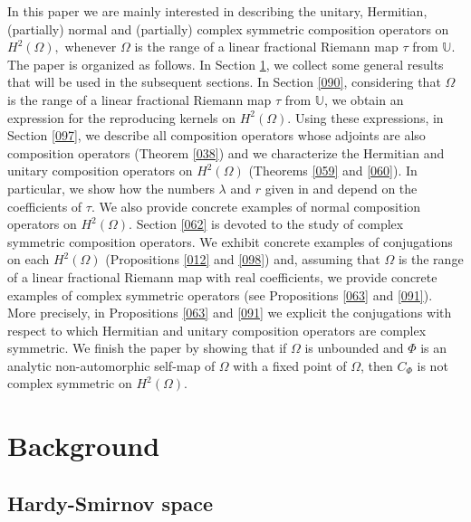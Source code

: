 \documentclass[11pt]{amsart}%
\theoremstyle{definition}
\theoremstyle{remark}
\numberwithin{equation}{section}
\begin{document}
In this paper we are mainly interested in describing the unitary, Hermitian,
(partially) normal and (partially) complex symmetric composition operators on
$H^{2}(\Omega),$ whenever $\Omega$ is the range of a linear fractional Riemann
map $\tau$ from $\mathbb{U}.$ The paper is organized as follows. In Section
\ref{089}, we collect some general results that will be used in the subsequent
sections. In Section \ref{090}, considering that $\Omega$ is the range of a
linear fractional Riemann map $\tau$ from $\mathbb{U}$, we obtain an
expression for the reproducing kernels on $H^{2}(\Omega)$. Using these
expressions, in Section \ref{097}, we describe all composition operators whose
adjoints are also composition operators (Theorem \ref{038}) and we
characterize the Hermitian and unitary composition operators on $H^{2}%
(\Omega)$ (Theorems \ref{059} and \ref{060}). In particular, we show how the
numbers $\lambda$ and $r$ given in \cite[Theorem 3.3]{Gajath} and
\cite[Theorem 3.2]{Jovic} depend on the coefficients of $\tau.$ We also
provide concrete examples of normal composition operators on $H^{2}(\Omega). $
Section \ref{062} is devoted to the study of complex symmetric composition
operators. We exhibit concrete examples of conjugations on each $H^{2}%
(\Omega)$ (Propositions \ref{012} and \ref{098}) and, assuming that $\Omega$
is the range of a linear fractional Riemann map with real coefficients, we
provide concrete examples of complex symmetric operators (see Propositions
\ref{063} and \ref{091}). More precisely, in Propositions \ref{063} and
\ref{091} we explicit the conjugations with respect to which Hermitian and
unitary composition operators are complex symmetric. We finish the paper by
showing that if $\Omega$ is unbounded and $\Phi$ is an analytic
non-automorphic self-map of $\Omega$ with a fixed point of $\Omega$, then
$C_{\Phi}$ is not complex symmetric on $H^{2}(\Omega).$

\section{Background}

\label{089}

\subsection{Hardy-Smirnov space}
\end{document}
